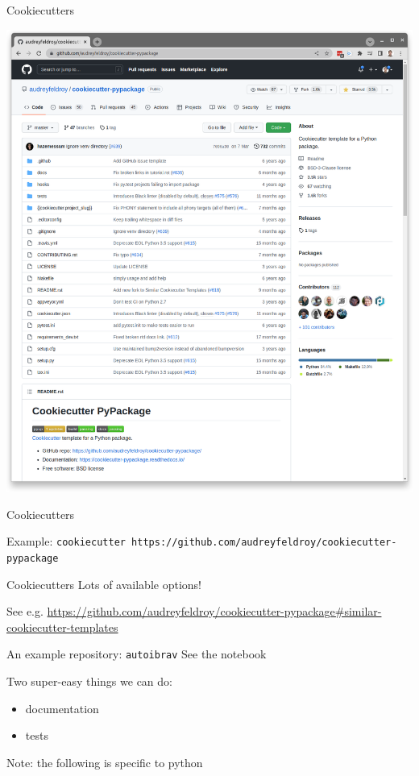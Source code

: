 \documentclass[xcolor=table,aspectratio=169]{beamer}
\numberwithin{equation}{section}
\begin{document}
\begin{frame}{Cookiecutters}
{\begin{minipage}[c][][c]{0.4\textwidth}
    \includegraphics[width=\textwidth]{figures/af_cookiecutter.png}
  \end{minipage}
  }

\end{frame}

\begin{frame}{Cookiecutters}

  \small
  Example: \texttt{cookiecutter https://github.com/audreyfeldroy/cookiecutter-pypackage}

\end{frame}

\begin{frame}{Cookiecutters}
  Lots of available options!

  See e.g. \url{https://github.com/audreyfeldroy/cookiecutter-pypackage\#similar-cookiecutter-templates}
\end{frame}

\begin{frame}{An example repository: \texttt{autoibrav}}
  See the notebook

  \vspace{1cm}
  Two super-easy things we can do:
  \begin{itemize}
    \item documentation
    \item tests
  \end{itemize}

  \vspace{1cm}
  Note: the following is specific to python
\end{frame}
\end{document}
